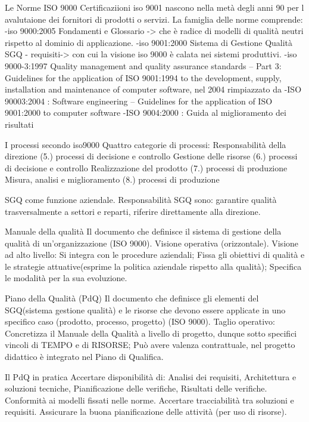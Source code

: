\documentclass{report}
\begin{document}
Le Norme ISO 9000
Certificaziioni iso 9001 nascono nella metà degli anni 90 per l avalutaione dei fornitori di prodotti o servizi. La famiglia delle norme comprende: 
-iso 9000:2005 Fondamenti e Glossario -> che è radice di modelli di qualità neutri rispetto al dominio di applicazione.
-iso 9001:2000 Sistema di Gestione Qualità SGQ - requisiti-> con cui la visione iso 9000 è calata nei sistemi produttivi.
-iso 9000-3:1997  Quality management and quality assurance standards – Part 3: Guidelines for the application of ISO 9001:1994 to the development, supply, installation and maintenance of computer software, nel 2004 rimpiazzato da
-ISO 90003:2004 : Software engineering – Guidelines for the application of ISO 9001:2000 to computer software
-ISO 9004:2000 : Guida al miglioramento dei risultati

I processi secondo iso9000
Quattro categorie di processi:
Responsabilità della direzione (5.) processi di decisione e controllo
Gestione delle risorse (6.) processi di decisione e controllo
Realizzazione del prodotto (7.) processi di produzione
Misura, analisi e miglioramento (8.) processi di produzione

SGQ come funzione aziendale. Responsabilità SGQ sono: garantire qualità trasversalmente a settori e reparti, riferire direttamente alla direzione.

Manuale della qualità
Il documento che definisce il sistema di gestione della qualità di un’organizzazione (ISO 9000).  Visione operativa (orizzontale).
Visione ad alto livello:
Si integra con le procedure aziendali;
Fissa gli obiettivi di qualità e le strategie attuative(esprime la politica aziendale rispetto alla qualità);
Specifica le modalità per la sua evoluzione.

Piano della Qualità (PdQ)
Il documento che definisce gli elementi del SGQ(sistema gestione qualità) e le risorse che devono essere applicate in uno specifico caso (prodotto, processo, progetto) (ISO 9000).
Taglio operativo:
Concretizza il Manuale della Qualità a livello di progetto, dunque sotto specifici vincoli di TEMPO e di RISORSE;
Può avere valenza contrattuale, nel progetto didattico è integrato nel Piano di Qualifica.

Il PdQ in pratica
Accertare disponibilità di: Analisi dei requisiti, Architettura e soluzioni tecniche, Pianificazione delle verifiche, Risultati delle verifiche.
Conformità ai modelli fissati nelle norme.
Accertare tracciabilità tra soluzioni e requisiti.
Assicurare la buona pianificazione delle attività (per uso di risorse).
\end{document}
